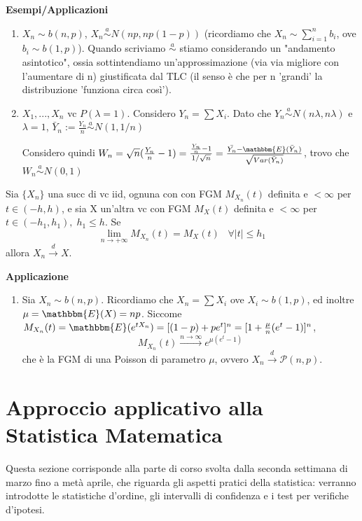 \noindent\textbf{Esempi/Applicazioni}
\begin{enumerate}
\item $X_n \sim b(n,p)$, $X_n \stackrel{a}{\sim}N(np,np(1-p))$ (ricordiamo che $X_n \sim \sum_{i=1}^n b_i$, ove $b_i \sim b(1,p)$).
Quando scriviamo $\stackrel{a}{\sim}$ stiamo considerando un "andamento asintotico", ossia sottintendiamo un'approssimazione (via via migliore con l'aumentare di n) giustificata dal TLC (il senso è che per n 'grandi' la distribuzione 'funziona circa così').
\item $X_1,...,X_n$ vc 
$P(\lambda =1)$. 
Considero $Y_n=\sum X_i$.
Dato che $Y_n \stackrel{a}
{\sim} N(n\lambda ,n \lambda )$ e $\lambda=1$,
 $\bar{Y}_n:=\frac{Y_n}{n} \stackrel{a}
 {\sim} N(1,1/n)$

 Considero quindi $W_n=\sqrt{n}(\frac{Y_n}{n}-1)=\frac{\frac{Y_n}{n}-1}
{1/\sqrt{n}}=\frac{\bar{Y_n} - \mathbbm{E}(\bar{Y}_n)}
{\sqrt{Var(\bar{Y}_n)}}$, trovo che $W_n \stackrel{a}{\sim} N(0,1) $
\end{enumerate}

\begin{teo}
Sia $\{X_n\}$ una succ di vc iid, ognuna con con FGM $M_{X_n}(t)$ definita e $<\infty$ per $t\in(-h,h)$, e sia X un'altra vc con FGM $M_X(t)$ definita e $<\infty$ per $t \in (-h_1,h_1), \; h_1\leq h$. Se $$\lim_{n \rightarrow +\infty} M_{X_n}(t)=M_X(t) \; \; \; \forall |t| \leq h_1$$ allora $X_n \stackrel{d}{\rightarrow} X$.
\end{teo}

\noindent\textbf{Applicazione}

\begin{enumerate}
\item Sia $X_n \sim b(n,p)$. 
Ricordiamo che $X_n=\sum X_i$ ove $X_i \sim b(1,p)$, ed inoltre $\mu=\mathbbm{E}(X)=np$.
Siccome $M_{X_n}(t)=
\mathbbm{E}(e^{tX_n})=[(1-p)+pe^t]^n=
[1+\frac{\mu}{n}(e^t - 1)]^n$, 
$$ M_{X_n}(t) \stackrel{n \rightarrow \infty}{\longrightarrow} 
e^{\mu(e^t-1)}$$
che è la FGM di una Poisson di parametro $\mu$, ovvero $X_n \stackrel{d}{\rightarrow} \mathcal{P}(n,p).$
\end{enumerate}
\newpage
\section{Approccio applicativo alla Statistica Matematica}
Questa sezione corrisponde alla parte di corso svolta dalla seconda settimana di marzo fino a metà aprile, che riguarda gli aspetti pratici della statistica: verranno introdotte le statistiche d'ordine, gli intervalli di confidenza e i test per verifiche d'ipotesi.

